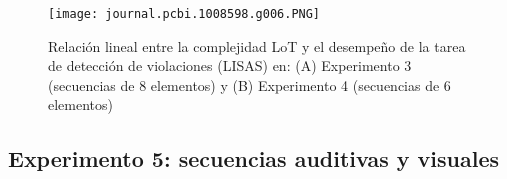 \begin{figure}[t!]
   \texttt{[image: journal.pcbi.1008598.g006.PNG]}
   \centering
   \caption{Relación lineal entre la complejidad LoT y el desempeño de la tarea de detección de violaciones (LISAS) en: (A) Experimento 3 (secuencias de 8 elementos) y (B) Experimento 4 (secuencias de 6 elementos)}
   \label{PlosBIO-F6}
\end{figure}

\subsection{Experimento 5: secuencias auditivas y visuales}


